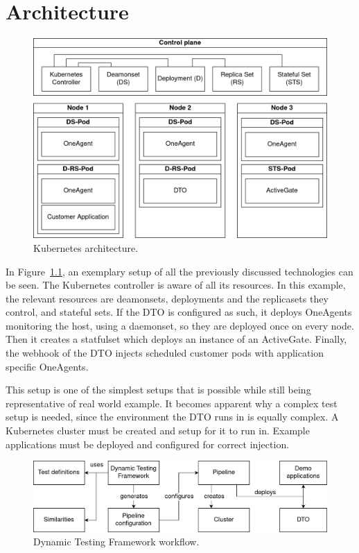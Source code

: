 \chapter{Architecture}\label{ch:architecture}

\begin{figure}[h]
    \centering
    \includegraphics[width=\textwidth]{img/context/kubernetes}
    \caption{Kubernetes architecture.}
    \label{fig:kubernetes-architecture}
\end{figure}

In Figure~\ref{fig:kubernetes-architecture}, an exemplary setup of all the previously discussed technologies can be seen.
The Kubernetes controller is aware of all its resources.
In this example, the relevant resources are deamonsets, deployments and the replicasets they control, and stateful sets.
If the DTO is configured as such, it deploys OneAgents monitoring the host, using a daemonset, so they are deployed once on every node.
Then it creates a statfulset which deploys an instance of an ActiveGate.
Finally, the webhook of the DTO injects scheduled customer pods with application specific OneAgents.

This setup is one of the simplest setups that is possible while still being representative of real world example.
It becomes apparent why a complex test setup is needed, since the environment the DTO runs in is equally complex.
A Kubernetes cluster must be created and setup for it to run in.
Example applications must be deployed and configured for correct injection.

\begin{figure}[H]
    \centering
    \includegraphics[width=\textwidth]{img/context/dtf}
    \caption{Dynamic Testing Framework workflow.}
    \label{fig:dtf-workflow}
\end{figure}

